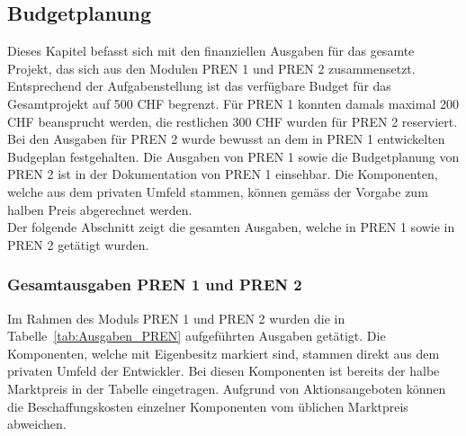 \documentclass[main.tex]{subfiles} %
\begin{document}

\subsection{Budgetplanung}

Dieses Kapitel befasst sich mit den finanziellen Ausgaben für das gesamte Projekt, das sich aus den Modulen PREN 1 und PREN 2 zusammensetzt.
Entsprechend der Aufgabenstellung ist das verfügbare Budget 
für das Gesamtprojekt auf 500 CHF begrenzt. Für PREN 1 konnten damals maximal 200 CHF
beansprucht werden, die restlichen 300 CHF wurden für PREN 2 reserviert. Bei den Ausgaben für PREN 2 wurde bewusst an dem in PREN 1 entwickelten Budgeplan festgehalten.
Die Ausgaben von PREN 1 sowie die Budgetplanung von PREN 2 ist in der Dokumentation von PREN 1 einsehbar.
Die Komponenten, welche aus dem privaten Umfeld stammen, 
können gemäss der Vorgabe zum halben Preis abgerechnet werden.\\
Der folgende Abschnitt zeigt die gesamten Ausgaben, welche in PREN 1 sowie in PREN 2 getätigt wurden.

\subsubsection{Gesamtausgaben PREN 1 und PREN 2}
Im Rahmen des Moduls PREN 1 und PREN 2 wurden die in
Tabelle~\ref{tab:Ausgaben_PREN} aufgeführten Ausgaben getätigt. Die Komponenten, welche mit 
Eigenbesitz markiert sind, stammen direkt aus dem privaten Umfeld der Entwickler.
Bei diesen Komponenten ist bereits der halbe Marktpreis in der Tabelle eingetragen.
Aufgrund von Aktionsangeboten können die Beschaffungskosten einzelner Komponenten vom
üblichen Marktpreis abweichen.
\end{document}

